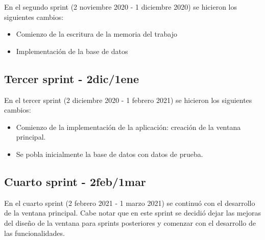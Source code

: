 En el segundo sprint (2 noviembre 2020 - 1 diciembre 2020) se hicieron los siguientes cambios:
\begin{itemize}
	\item Comienzo de la escritura de la memoria del trabajo
	\item Implementación de la base de datos
\end{itemize}

\subsection{Tercer sprint - 2dic/1ene}

En el tercer sprint (2 diciembre 2020 - 1 febrero 2021) se hicieron los siguientes cambios:
\begin{itemize}
	\item Comienzo de la implementación de la aplicación: creación de la ventana principal.
	\item Se pobla inicialmente la base de datos con datos de prueba.
\end{itemize}

\subsection{Cuarto sprint - 2feb/1mar}

En el cuarto sprint (2 febrero 2021 - 1 marzo 2021) se continuó con el desarrollo de la ventana principal. Cabe notar que en este sprint se decidió dejar las mejoras del diseño de la ventana para sprints posteriores y comenzar con el desarrollo de las funcionalidades.
